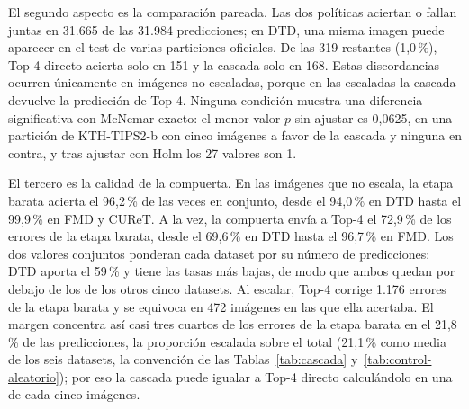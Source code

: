 \documentclass[a4paper,fleqn]{cas-sc}
\begin{document}
El segundo aspecto es la comparación pareada. Las dos políticas aciertan o fallan juntas en 31.665 de las 31.984 predicciones; en DTD, una misma imagen puede aparecer en el test de varias particiones oficiales. De las 319 restantes (1,0\,\%), Top-4 directo acierta solo en 151 y la cascada solo en 168. Estas discordancias ocurren únicamente en imágenes no escaladas, porque en las escaladas la cascada devuelve la predicción de Top-4. Ninguna condición muestra una diferencia significativa con McNemar exacto: el menor valor $p$ sin ajustar es 0,0625, en una partición de KTH-TIPS2-b con cinco imágenes a favor de la cascada y ninguna en contra, y tras ajustar con Holm los 27 valores son 1.

El tercero es la calidad de la compuerta. En las imágenes que no escala, la etapa barata acierta el 96,2\,\% de las veces en conjunto, desde el 94,0\,\% en DTD hasta el 99,9\,\% en FMD y CUReT. A la vez, la compuerta envía a Top-4 el 72,9\,\% de los errores de la etapa barata, desde el 69,6\,\% en DTD hasta el 96,7\,\% en FMD. Los dos valores conjuntos ponderan cada dataset por su número de predicciones: DTD aporta el 59\,\% y tiene las tasas más bajas, de modo que ambos quedan por debajo de los de los otros cinco datasets. Al escalar, Top-4 corrige 1.176 errores de la etapa barata y se equivoca en 472 imágenes en las que ella acertaba. El margen concentra así casi tres cuartos de los errores de la etapa barata en el 21,8\,\% de las predicciones, la proporción escalada sobre el total (21,1\,\% como media de los seis datasets, la convención de las Tablas~\ref{tab:cascada} y~\ref{tab:control-aleatorio}); por eso la cascada puede igualar a Top-4 directo calculándolo en una de cada cinco imágenes.
\end{document}
